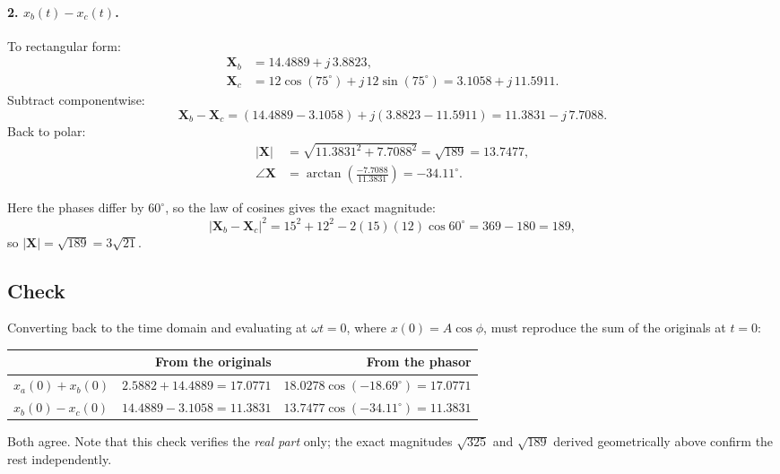 \paragraph{2. $x_b(t) - x_c(t)$.}
To rectangular form:
\begin{align}
  \mathbf{X}_b &= 14.4889 + j\,3.8823, \\
  \mathbf{X}_c &= 12\cos(75^\circ) + j\,12\sin(75^\circ) = 3.1058 + j\,11.5911.
\end{align}
Subtract componentwise:
\begin{equation}
  \mathbf{X}_b - \mathbf{X}_c = (14.4889 - 3.1058) + j(3.8823 - 11.5911)
                              = 11.3831 - j\,7.7088.
\end{equation}
Back to polar:
\begin{align}
  |\mathbf{X}| &= \sqrt{11.3831^2 + 7.7088^2} = \sqrt{189} = 13.7477, \\
  \angle\mathbf{X} &= \arctan\!\left(\frac{-7.7088}{11.3831}\right) = -34.11^\circ .
\end{align}

Here the phases differ by $60^\circ$, so the law of cosines gives the exact
magnitude:
\begin{equation}
  |\mathbf{X}_b - \mathbf{X}_c|^2 = 15^2 + 12^2 - 2(15)(12)\cos 60^\circ
    = 369 - 180 = 189,
\end{equation}
so $|\mathbf{X}| = \sqrt{189} = 3\sqrt{21}$.

\subsection*{Check}

Converting back to the time domain and evaluating at $\omega t = 0$, where
$x(0) = A\cos\phi$, must reproduce the sum of the originals at $t = 0$:

\begin{center}
\begin{tabular}{lrr}
  \toprule
  & From the originals & From the phasor \\
  \midrule
  $x_a(0) + x_b(0)$ & $2.5882 + 14.4889 = 17.0771$ & $18.0278\cos(-18.69^\circ) = 17.0771$ \\
  $x_b(0) - x_c(0)$ & $14.4889 - 3.1058 = 11.3831$ & $13.7477\cos(-34.11^\circ) = 11.3831$ \\
  \bottomrule
\end{tabular}
\end{center}

Both agree. Note that this check verifies the \emph{real part} only; the exact
magnitudes $\sqrt{325}$ and $\sqrt{189}$ derived geometrically above confirm the
rest independently.

